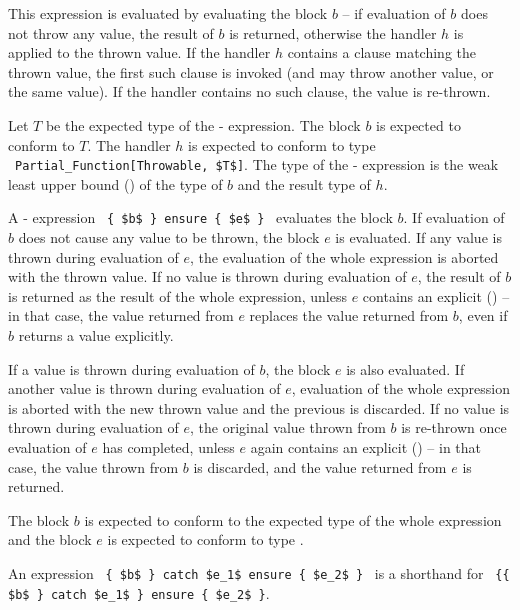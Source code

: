 This expression is evaluated by evaluating the block $b$ -- if evaluation of $b$ does not throw any value, the result of $b$ is returned, otherwise the handler $h$ is applied to the thrown value. If the handler $h$ contains a  clause matching the thrown value, the first such clause is invoked (and may throw another value, or the same value). If the handler contains no such clause, the value is re-thrown. 

Let $T$ be the expected type of the - expression. The block $b$ is expected to conform to $T$. The handler $h$ is expected to conform to type ~\lstinline!Partial_Function[Throwable, $T$]!. The type of the - expression is the weak least upper bound () of the type of $b$ and the result type of $h$. 

A - expression ~\lstinline!{ $b$ } ensure { $e$ }!~ evaluates the block $b$. If evaluation of $b$ does not cause any value to be thrown, the block $e$ is evaluated. If any value is thrown during evaluation of $e$, the evaluation of the whole expression is aborted with the thrown value. If no value is thrown during evaluation of $e$, the result of $b$ is returned as the result of the whole expression, unless $e$ contains an explicit  () -- in that case, the value returned from $e$ replaces the value returned from $b$, even if $b$ returns a value explicitly. 

If a value is thrown during evaluation of $b$, the  block $e$ is also evaluated. If another value is thrown during evaluation of $e$, evaluation of the whole expression is aborted with the new thrown value and the previous is discarded. If no value is thrown during evaluation of $e$, the original value thrown from $b$ is re-thrown once evaluation of $e$ has completed, unless $e$ again contains an explicit  () -- in that case, the value thrown from $b$ is discarded, and the value returned from $e$ is returned. 


The block $b$ is expected to conform to the expected type of the whole expression and the  block $e$ is expected to conform to type . 

An expression ~\lstinline!{ $b$ } catch $e_1$ ensure { $e_2$ }!~ is a shorthand for ~\lstinline!{{ $b$ } catch $e_1$ } ensure { $e_2$ }!. 





